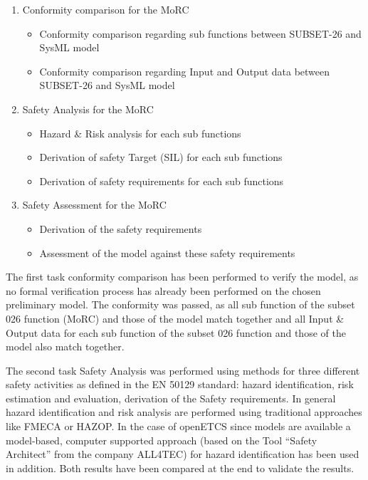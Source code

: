 \documentclass{template/openetcs_report}
\begin{document}
 
\begin{enumerate}
\item Conformity comparison for the MoRC
	\begin{itemize}
	\item Conformity comparison regarding sub functions between SUBSET-26 and SysML model
	\item Conformity comparison regarding Input and Output data between SUBSET-26 and SysML model
	\end{itemize}
	
\item Safety Analysis for the MoRC
	\begin{itemize}
	\item Hazard \& Risk analysis for each sub functions
	\item Derivation of safety Target (SIL) for each sub functions
	\item Derivation of safety requirements for each sub functions
	\end{itemize}
	
\item Safety Assessment for the MoRC
	\begin{itemize}
	\item Derivation of the safety requirements
	\item Assessment of the model against these safety requirements
	\end{itemize}
\end{enumerate} 
 

The first task conformity comparison has been performed to verify the model, as no formal verification process has already been performed on the chosen preliminary model. The conformity was passed, as all sub function of the subset 026 function (MoRC) and those of the model match together and all Input \& Output data for each sub function of the subset 026 function and those of the model also match together. 

 
The second task Safety Analysis was performed using methods for three different safety activities as defined in the EN 50129 standard: hazard identification,
risk estimation and evaluation, derivation of the Safety requirements. In general hazard identification and risk analysis are performed using traditional approaches like FMECA or HAZOP. In the case of openETCS since models are available a model-based, computer supported approach (based on the Tool “Safety Architect” from the company ALL4TEC) for hazard identification has been used in addition.
Both results have been compared at the end to validate the results.
 
\end{document}
